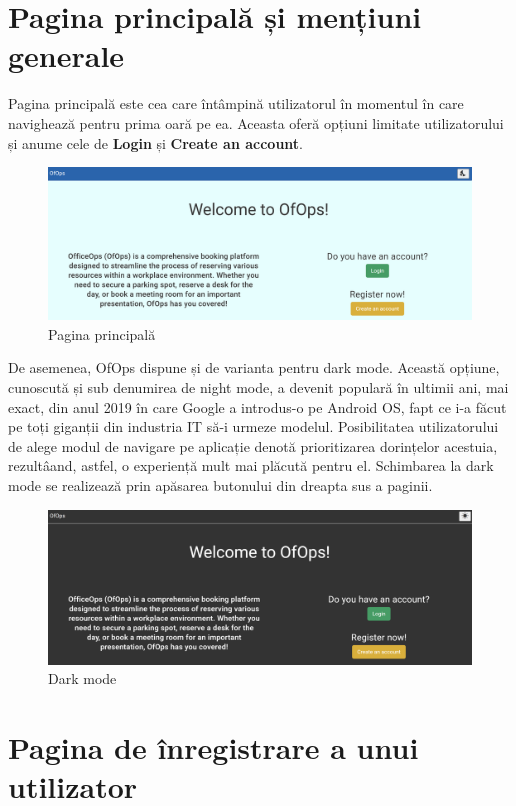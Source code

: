 \section{Pagina principală și mențiuni generale}

Pagina principală este cea care întâmpină utilizatorul în momentul în care navighează pentru prima oară pe ea. Aceasta oferă opțiuni limitate utilizatorului și anume cele de \textbf{Login} și \textbf{Create an account}.

\begin{figure}[!htb]
    \centering
    \includegraphics[width=0.9\linewidth]{images/pagina-nelogat.png}
    \caption{Pagina principală}
    \label{fig:principal}
\end{figure}

De asemenea, OfOps dispune și de varianta pentru dark mode. Această opțiune, cunoscută și sub denumirea de night mode, a devenit populară în ultimii ani, mai exact, din anul 2019 în care Google a introdus-o pe Android OS, fapt ce i-a făcut pe toți giganții din industria IT să-i urmeze modelul.\cite{citation9} Posibilitatea utilizatorului de alege modul de navigare pe aplicație denotă prioritizarea dorințelor acestuia, rezultâand, astfel, o experiență mult mai plăcută pentru el. Schimbarea la dark mode se realizează prin apăsarea butonului din dreapta sus a paginii.

\begin{figure}[!htb]
    \centering
    \includegraphics[width=0.9\linewidth]{images/dark.png}
    \caption{Dark mode}
    \label{fig:dark}
\end{figure}

\section{Pagina de înregistrare a unui utilizator}

